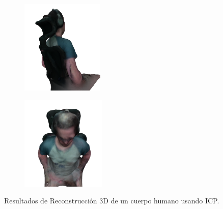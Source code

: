 \begin{figure}[h]
\begin{subfigure}[t]{0.2\textheight}
    \end{subfigure}
    \begin{subfigure}[t]{0.2\textheight}
    	\centering
        \includegraphics[height=4.5cm]{archivos/experimentacion-4-resultado-malla-4.png}
    \end{subfigure}
    \begin{subfigure}[t]{0.2\textheight}
    	\centering
        \includegraphics[height=4.5cm]{archivos/experimentacion-4-resultado-malla-5.png}
    \end{subfigure}
    \caption{Resultados de Reconstrucción 3D de un cuerpo humano usando ICP.}
    \label{fig:resultados-reconstruccion-cuerpo-icp}
\end{figure}

